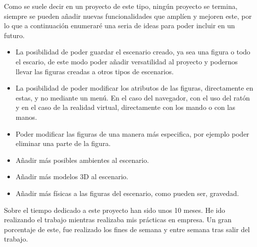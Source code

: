 \documentclass[a4paper, 12pt]{book}
\begin{document}
Como se suele decir en un proyecto de este tipo, ningún proyecto se termina, siempre se pueden añadir nuevas funcionalidades que amplíen y mejoren este, por lo que a continuación enumeraré una seria de ideas para poder incluir en un futuro.

\begin{itemize}
    \item La posibilidad de poder guardar el escenario creado, ya sea una figura o todo el escario, de este modo poder añadir versatilidad al proyecto y podernos llevar las figuras creadas a otros tipos de escenarios.
    \item La posibilidad de poder modificar los atributos de las figuras, directamente en estas, y no mediante un menú. En el caso del navegador, con el uso del ratón y en el caso de la realidad virtual, directamente con los mando o con las manos.
    \item Poder modificar las figuras de una manera más especifica, por ejemplo poder eliminar una parte de la figura.
    \item Añadir más posibles ambientes al escenario.
    \item Añadir más modelos 3D al escenario.
    \item Añadir más físicas a las figuras del escenario, como pueden ser, gravedad.
\end{itemize}

Sobre el tiempo dedicado a este proyecto han sido unos 10 meses. He ido realizando el trabajo mientras realizaba mis prácticas en empresa. Un gran porcentaje de este, fue realizado los fines de semana y entre semana tras salir del trabajo.

\cleardoublepage


\end{document}
